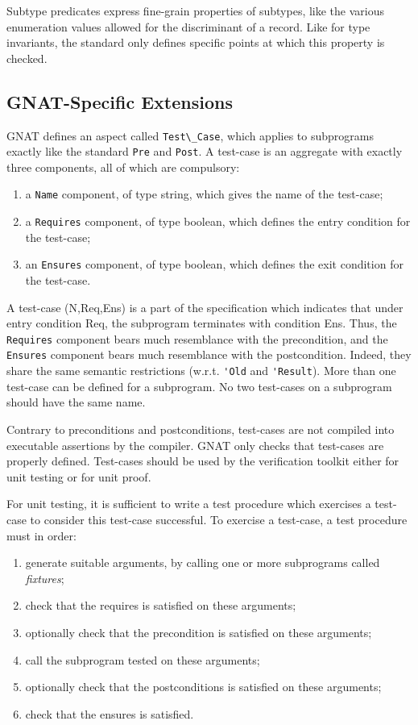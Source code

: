 \documentclass{article}
\begin{document}
Subtype predicates express fine-grain properties of subtypes, like the various
enumeration values allowed for the discriminant of a record. Like for type
invariants, the standard only defines specific points at which this property is
checked.

\subsection{GNAT-Specific Extensions}
\label{sub:formal-containers}

GNAT defines an aspect called \verb|Test\_Case|, which applies to subprograms
exactly like the standard \verb|Pre| and \verb|Post|. A test-case is an
aggregate with exactly three components, all of which are compulsory:
\begin{enumerate}
\item a \verb|Name| component, of type string, which gives the name of the
  test-case;
\item a \verb|Requires| component, of type boolean, which defines the entry
  condition for the test-case;
\item an \verb|Ensures| component, of type boolean, which defines the exit
  condition for the test-case.
\end{enumerate}

A test-case (N,Req,Ens) is a part of the specification which indicates that
under entry condition Req, the subprogram terminates with condition Ens. Thus,
the \verb|Requires| component bears much resemblance with the precondition, and
the \verb|Ensures| component bears much resemblance with the
postcondition. Indeed, they share the same semantic restrictions
(w.r.t. \verb|'Old| and \verb|'Result|).  More than one test-case can be
defined for a subprogram. No two test-cases on a subprogram should have the
same name.

Contrary to preconditions and postconditions, test-cases are not compiled into
executable assertions by the compiler. GNAT only checks that test-cases are
properly defined. Test-cases should be used by the verification toolkit either
for unit testing or for unit proof.

For unit testing, it is sufficient to write a test procedure which exercises a
test-case to consider this test-case successful. To exercise a test-case, a
test procedure must in order:
\begin{enumerate}
\item generate suitable arguments, by calling one or more subprograms
  called \textit{fixtures};
\item check that the requires is satisfied on these arguments;
\item optionally check that the precondition is satisfied on these arguments;
\item call the subprogram tested on these arguments;
\item optionally check that the postconditions is satisfied on these arguments;
\item check that the ensures is satisfied.
\end{enumerate}
\end{document}
